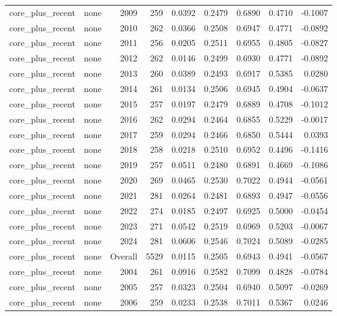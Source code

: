 \begin{table}[t]
\begin{tabular}{@{} l l r r r r r r r @{} }
      core\_plus\_recent & none & 2009 & 259 & 0.0392 & 0.2479 & 0.6890 & 0.4710 & -0.1007 \\
      core\_plus\_recent & none & 2010 & 262 & 0.0366 & 0.2508 & 0.6947 & 0.4771 & -0.0892 \\
      core\_plus\_recent & none & 2011 & 256 & 0.0205 & 0.2511 & 0.6955 & 0.4805 & -0.0827 \\
      core\_plus\_recent & none & 2012 & 262 & 0.0146 & 0.2499 & 0.6930 & 0.4771 & -0.0892 \\
      core\_plus\_recent & none & 2013 & 260 & 0.0389 & 0.2493 & 0.6917 & 0.5385 & 0.0280 \\
      core\_plus\_recent & none & 2014 & 261 & 0.0134 & 0.2506 & 0.6945 & 0.4904 & -0.0637 \\
      core\_plus\_recent & none & 2015 & 257 & 0.0197 & 0.2479 & 0.6889 & 0.4708 & -0.1012 \\
      core\_plus\_recent & none & 2016 & 262 & 0.0294 & 0.2464 & 0.6855 & 0.5229 & -0.0017 \\
      core\_plus\_recent & none & 2017 & 259 & 0.0294 & 0.2466 & 0.6850 & 0.5444 & 0.0393 \\
      core\_plus\_recent & none & 2018 & 258 & 0.0218 & 0.2510 & 0.6952 & 0.4496 & -0.1416 \\
      core\_plus\_recent & none & 2019 & 257 & 0.0511 & 0.2480 & 0.6891 & 0.4669 & -0.1086 \\
      core\_plus\_recent & none & 2020 & 269 & 0.0465 & 0.2530 & 0.7022 & 0.4944 & -0.0561 \\
      core\_plus\_recent & none & 2021 & 281 & 0.0264 & 0.2481 & 0.6893 & 0.4947 & -0.0556 \\
      core\_plus\_recent & none & 2022 & 274 & 0.0185 & 0.2497 & 0.6925 & 0.5000 & -0.0454 \\
      core\_plus\_recent & none & 2023 & 271 & 0.0542 & 0.2519 & 0.6969 & 0.5203 & -0.0067 \\
      core\_plus\_recent & none & 2024 & 281 & 0.0606 & 0.2546 & 0.7024 & 0.5089 & -0.0285 \\
      core\_plus\_recent & none & Overall & 5529 & 0.0115 & 0.2505 & 0.6943 & 0.4941 & -0.0567 \\
      core\_plus\_recent & none & 2004 & 261 & 0.0916 & 0.2582 & 0.7099 & 0.4828 & -0.0784 \\
      core\_plus\_recent & none & 2005 & 257 & 0.0323 & 0.2504 & 0.6940 & 0.5097 & -0.0269 \\
      core\_plus\_recent & none & 2006 & 259 & 0.0233 & 0.2538 & 0.7011 & 0.5367 & 0.0246 \\

\end{tabular}
\end{table}

